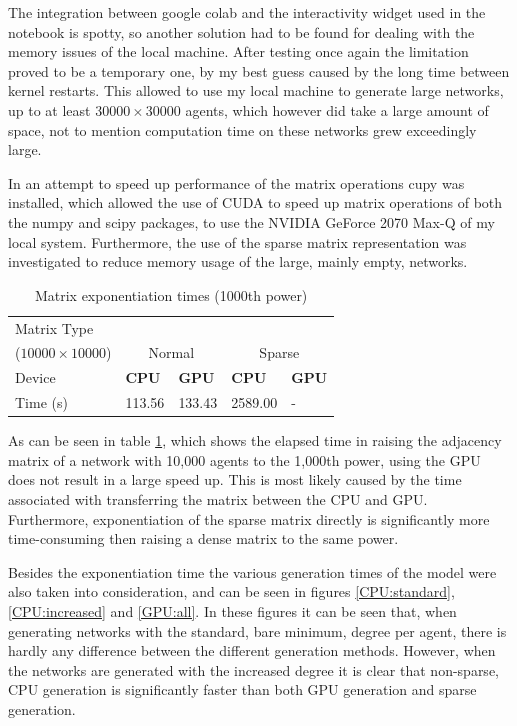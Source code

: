 \documentclass{article}
\begin{document}
The integration between google colab and the interactivity widget used in the notebook is spotty, so another solution had to be found for dealing with the memory issues of the local machine. After testing once again the limitation proved to be a temporary one, by my best guess caused by the long time between kernel restarts. This allowed to use my local machine to generate large networks, up to at least $30000 \times 30000$ agents, which however did take a large amount of space, not to mention computation time on these networks grew exceedingly large.

In an  attempt to speed up performance of the matrix operations cupy was installed, which allowed the use of CUDA to speed up matrix operations of both the numpy and scipy packages, to use the NVIDIA GeForce 2070 Max-Q of my local system. Furthermore, the use of the sparse matrix representation was investigated to reduce memory usage of the large, mainly empty, networks.

\begin{table}[H]
    \centering
    \begin{tabular}{lllll}
        \toprule
        Matrix Type\\ ($10000 \times 10000$) & \multicolumn{2}{c}{Normal} & \multicolumn{2}{c}{Sparse}\\
        \midrule 
        Device &\textbf{CPU} & \textbf{GPU} & \textbf{CPU} & \textbf{GPU} \\
        \midrule
        Time (s) & 113.56 & 133.43 & 2589.00 & - \\
        \bottomrule
    \end{tabular}
    \label{table:exp_time}
    \caption{Matrix exponentiation times (1000th power)}
\end{table}

As can be seen in table \ref{table:exp_time}, which shows the elapsed time in raising the adjacency matrix of a network with 10,000 agents to the 1,000th power, using the GPU does not result in a large speed up. This is most likely caused by the time associated with transferring the matrix between the CPU and GPU. Furthermore, exponentiation of the sparse matrix directly is significantly more time-consuming then raising a dense matrix to the same power.

Besides the exponentiation time the various generation times of the model were also taken into consideration, and can be seen in figures \ref{CPU:standard}, \ref{CPU:increased} and \ref{GPU:all}.
In these figures it can be seen that, when generating networks with the standard, bare minimum, degree per agent, there is hardly any difference between the different generation methods. However, when the networks are generated with the increased degree it is clear that non-sparse, CPU generation is significantly faster than both GPU generation and sparse generation.
\end{document}
